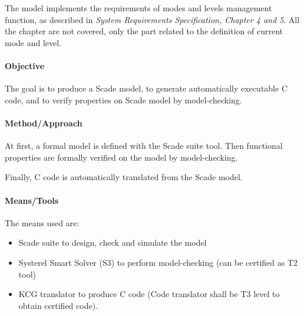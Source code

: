 The model implements the requirements of modes and levels management function, as described in {\itshape System Requirements Specification, Chapter 4 and 5}.
All the chapter are not covered, only the part related to  the definition of current mode and level.


\paragraph{Objective}


The goal is to produce a Scade model, to generate automatically executable C code, and to  verify properties on Scade model by model-checking.



\paragraph{Method/Approach}

At first, a formal model is defined with the Scade suite tool.
Then functional properties are formally verified on the model by  model-checking.

Finally, C code is automatically translated from the Scade model.

\paragraph{Means/Tools}


The means used are:
\begin{itemize}
\item Scade suite to  design, check and simulate the model 
\item Systerel Smart Solver (S3) to perform model-checking (can be certified as T2 tool)
\item KCG translator to produce C code (Code translator shall be T3 level to obtain certified code).
\end{itemize}


